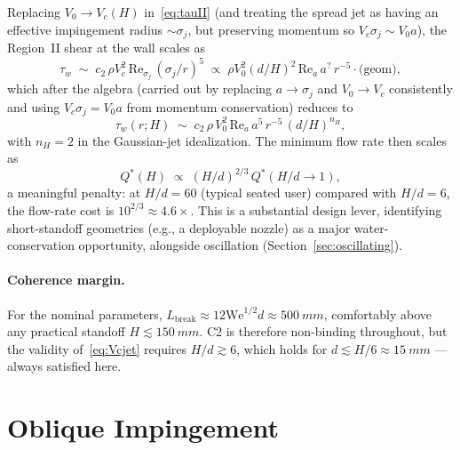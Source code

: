 \documentclass[aps,prfluids,reprint,amsmath,amssymb,floatfix]{revtex4-2}
\newcommand{\Rey}{\mathrm{Re}}
\newcommand{\We}{\mathrm{We}}
\begin{document}
Replacing $V_0 \to V_c(H)$ in~\eqref{eq:tauII} (and treating the spread
jet as having an effective impingement radius $\sim \sigma_j$, but
preserving momentum so $V_c \sigma_j \sim V_0 a$), the Region~II shear
at the wall scales as
\begin{equation}
  \tau_w \;\sim\; c_2\,\rho V_c^2\,\Rey_{\sigma_j}\,(\sigma_j/r)^5
  \;\propto\; \rho V_0^2 (d/H)^{2}\,\Rey_a\,a^{?}\,r^{-5} \cdot \text{(geom)},
\end{equation}
which after the algebra (carried out by replacing $a \to \sigma_j$ and
$V_0 \to V_c$ consistently and using $V_c \sigma_j = V_0 a$ from
momentum conservation) reduces to
\begin{equation}
  \tau_w(r;H) \;\sim\; c_2\,\rho\,V_0^2\,\Rey_a\,a^5\,r^{-5}\,(d/H)^{n_H},
  \label{eq:tauIIH}
\end{equation}
with $n_H = 2$ in the Gaussian-jet idealization. The minimum flow rate
then scales as
\begin{equation}
  Q^*(H) \;\propto\; (H/d)^{2/3}\,Q^*(H/d \to 1),
  \label{eq:QstarH}
\end{equation}
a meaningful penalty: at $H/d = 60$ (typical seated user) compared with
$H/d = 6$, the flow-rate cost is $10^{2/3} \approx 4.6\times$. This is a
substantial design lever, identifying short-standoff geometries (e.g., a
deployable nozzle) as a major water-conservation opportunity, alongside
oscillation (Section~\ref{sec:oscillating}).

\paragraph{Coherence margin.}
For the nominal parameters, $L_\mathrm{break} \approx 12\We^{1/2}d \approx
\SI{500}{mm}$, comfortably above any practical standoff $H \lesssim
\SI{150}{mm}$. C2 is therefore non-binding throughout, but the validity
of~\eqref{eq:Vcjet} requires $H/d \gtrsim 6$, which holds for
$d \lesssim H/6 \approx \SI{15}{mm}$ --- always satisfied here.

\section{Oblique Impingement}
\label{sec:oblique}
\end{document}
